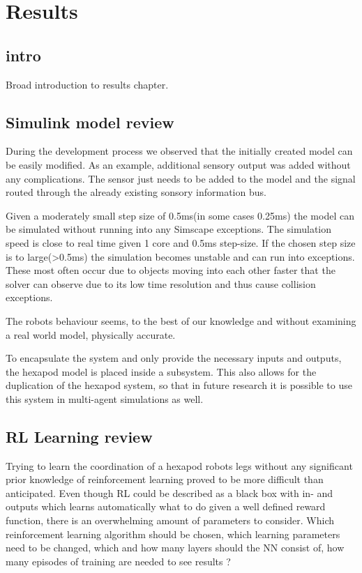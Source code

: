 \chapter{Results}
\label{ch:results}

\section{intro}
Broad introduction to results chapter.




\section{Simulink model review}
During the development process we observed that the initially created model can be easily modified.
As an example, additional sensory output was added without any complications.
The sensor just needs to be added to the model and the signal routed through the already existing sonsory information bus.

Given a moderately small step size of 0.5ms(in some cases 0.25ms) the model can be simulated without running into any Simscape exceptions.
The simulation speed is close to real time given 1 core and 0.5ms step-size.
If the chosen step size is to large(>0.5ms) the simulation becomes unstable and can run into exceptions.
These most often occur due to objects moving into each other faster that the solver can observe due to its low time resolution and thus cause collision exceptions.

The robots behaviour seems, to the best of our knowledge and without examining a real world model, physically accurate.

To encapsulate the system and only provide the necessary inputs and outputs, the hexapod model is placed inside a subsystem.
This also allows for the duplication of the hexapod system, so that in future research it is possible to use this system in multi-agent simulations as well.





\section{RL Learning review}

Trying to learn the coordination of a hexapod robots legs without any significant prior knowledge of reinforcement learning proved to be more difficult than anticipated.
Even though RL could be described as a black box with in- and outputs which learns automatically what to do given a well defined reward function, there is an overwhelming amount of parameters to consider.
Which reinforcement learning algorithm should be chosen, which learning parameters need to be changed, which and how many layers should the NN consist of, how many episodes of training are needed to see results ?


